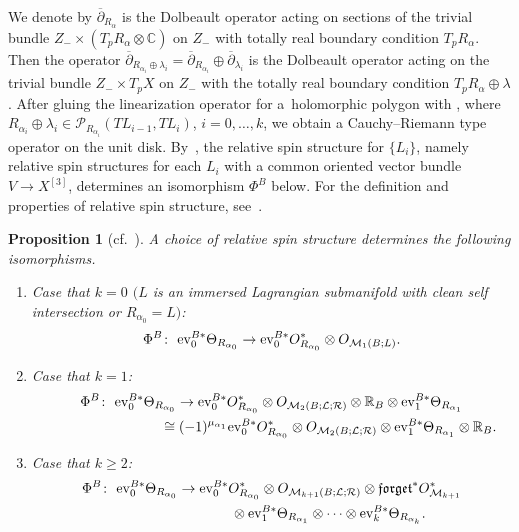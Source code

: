 \documentclass[pdftex]{sigma}
\numberwithin{equation}{section}
\newtheorem{prop}[thm]{Proposition}
\theoremstyle{definition}
\begin{document}
We denote by
$\overline{\partial}_{R_{\alpha}}$ is the Dolbeault operator acting on sections of the trivial bundle
$Z_- \times (T_pR_{\alpha} \otimes {\mathbb C})$ on $Z_-$ with totally real boundary
condition $T_pR_{\alpha}$. Then the operator
$\overline{\partial}_{R_{\alpha_i} \oplus \lambda_i} = \overline{\partial}_{R_{\alpha_i}} \oplus \overline{\partial}_{\lambda_i}$
is the Dolbeault operator acting on the trivial bundle $Z_- \times T_p X$ on $Z_-$ with the totally real boundary condition $T_p R_{\alpha} \oplus \lambda$.
After gluing the linearization operator  for a~holomorphic polygon with
, where
$R_{\alpha_i} \oplus \lambda_i \in {\mathcal P}_{R_{\alpha_i}} (TL_{i-1}, TL_i)$, $i=0, \dots, k$, we obtain a Cauchy--Riemann type operator
on the unit disk.
By~\cite[Theorem 8.1.1]{FOOO09II}, the relative spin structure for $\{L_i\}$, namely relative spin structures for each $L_i$ with a common oriented vector bundle~${V \to X^{[3]}}$, determines an isomorphism $\Phi^B$ below.
For the definition and properties of relative spin structure, see~\cite[Section 8.1.1]{FOOO09II}.

\begin{prop}[cf.\ {\cite[Theorem 8.1.1]{FOOO09II}}]
A choice of relative spin structure determines the following isomorphisms.
\begin{enumerate}\itemsep=0pt
\item[$(1)$] Case that $k=0$ $(L$ is an immersed Lagrangian submanifold with clean self intersection or $R_{\alpha_0}=L)$:
\begin{gather*}
\Phi^B\colon \ {\rm ev}_0^{B*} \Theta_{R_{\alpha_0}} \to
{\rm ev}_0^{B*} O_{R_{\alpha_0}}^* \otimes O_{{\mathcal M}_{1}(B;L)}.
\end{gather*}
\item[$(2)$]
Case that $k = 1$:
\begin{gather*}
\Phi^B\colon \ {\rm ev}_0^{B*} \Theta_{R_{\alpha_0}}  \to
{\rm ev}_0^{B*} O_{R_{\alpha_0}}^* \otimes O_{{\mathcal M}_{2}(B;{\mathcal L};{\mathcal R})} \otimes {\mathbb R}_B \otimes
{\rm ev}_1^{B*} \Theta_{R_{\alpha_1}}  \\
\hphantom{\Phi^B\colon \ {\rm ev}_0^{B*} \Theta_{R_{\alpha_0}}\to}{}
 \cong (-1)^{\mu_{\alpha_1}}
 {\rm ev}_0^{B*} O_{R_{\alpha_0}}^* \otimes O_{{\mathcal M}_{2}(B;{\mathcal L};{\mathcal R})} \otimes
{\rm ev}_1^{B*} \Theta_{R_{\alpha_1}} \otimes {\mathbb R}_B .
\end{gather*}
\item[$(3)$] Case that $k \geq 2$:
\begin{gather*}
\Phi^B\colon \ {\rm ev}_0^{B*} \Theta_{R_{\alpha_0}} \to
{\rm ev}_0^{B*} O_{R_{\alpha_0}}^* \otimes O_{{\mathcal M}_{k+1}(B;{\mathcal L};{\mathcal R})} \otimes {\mathfrak{forget}}^* O_{{\mathcal M}_{k+1}}^*\\
\hphantom{\Phi^B\colon \ {\rm ev}_0^{B*} \Theta_{R_{\alpha_0}} \to}{}
\otimes
{\rm ev}_1^{B*} \Theta_{R_{\alpha_1}} \otimes \dots \otimes {\rm ev}_k^{B*} \Theta_{R_{\alpha_k}}.
\end{gather*}
\end{enumerate}
\end{prop}
\end{document}

